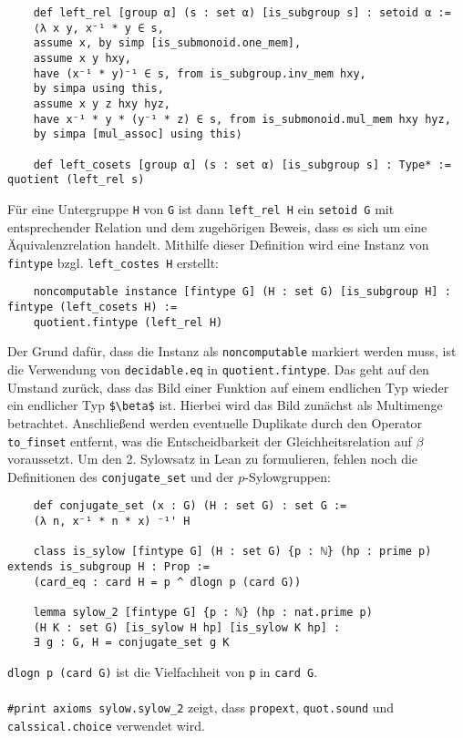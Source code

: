 \documentclass[a4paper,12pt]{scrartcl}
\newcommand{\ls}[1]{\lstinline|#1|}
\begin{document}
	\begin{lstlisting}
	def left_rel [group α] (s : set α) [is_subgroup s] : setoid α :=
	⟨λ x y, x⁻¹ * y ∈ s,
	assume x, by simp [is_submonoid.one_mem],
	assume x y hxy,
	have (x⁻¹ * y)⁻¹ ∈ s, from is_subgroup.inv_mem hxy,
	by simpa using this,
	assume x y z hxy hyz,
	have x⁻¹ * y * (y⁻¹ * z) ∈ s, from is_submonoid.mul_mem hxy hyz,
	by simpa [mul_assoc] using this⟩
	
	def left_cosets [group α] (s : set α) [is_subgroup s] : Type* := quotient (left_rel s)
	\end{lstlisting}
	Für eine Untergruppe \ls{H} von \ls{G} ist dann \ls{left_rel H} ein \ls{setoid G} mit entsprechender Relation und dem zugehörigen Beweis, dass es sich um eine Äquivalenzrelation handelt.
	Mithilfe dieser Definition wird eine Instanz von \ls{fintype} bzgl. \lstinline|left_costes H| erstellt:
	\begin{lstlisting}
	noncomputable instance [fintype G] (H : set G) [is_subgroup H] :  fintype (left_cosets H) := 
	quotient.fintype (left_rel H)
	\end{lstlisting}
	Der Grund dafür, dass die Instanz als \ls{noncomputable} markiert werden muss, ist die Verwendung von \ls{decidable.eq} in \ls{quotient.fintype}. Das geht auf den Umstand zurück, dass das Bild einer Funktion auf einem endlichen Typ wieder ein endlicher Typ \ls{$\beta$} ist. Hierbei wird das Bild zunächst als Multimenge betrachtet. Anschließend werden eventuelle Duplikate durch den Operator \ls{to_finset} entfernt, was die Entscheidbarkeit der Gleichheitsrelation auf $\beta$ voraussetzt.
	Um den 2. Sylowsatz in Lean zu formulieren, fehlen noch die Definitionen des \ls{conjugate_set} und der $p$-Sylowgruppen:
	\begin{lstlisting}
	def conjugate_set (x : G) (H : set G) : set G :=
	(λ n, x⁻¹ * n * x) ⁻¹' H
	
	class is_sylow [fintype G] (H : set G) {p : ℕ} (hp : prime p) extends is_subgroup H : Prop := 
	(card_eq : card H = p ^ dlogn p (card G))
	
	lemma sylow_2 [fintype G] {p : ℕ} (hp : nat.prime p)
	(H K : set G) [is_sylow H hp] [is_sylow K hp] :
	∃ g : G, H = conjugate_set g K 
	\end{lstlisting}
	\ls{dlogn p (card G)} ist die Vielfachheit von \ls{p} in \ls{card G}.\\\\
	\ls{#print axioms sylow.sylow_2} zeigt, dass \ls{propext}, \ls{quot.sound} und \ls{calssical.choice} verwendet wird.\\\\                                        
\end{document}
